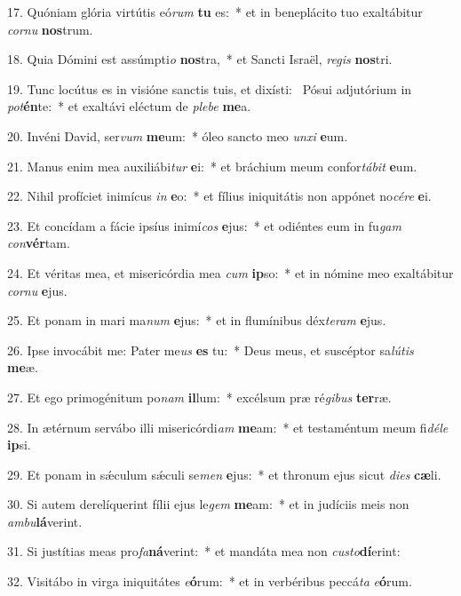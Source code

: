 17. Quóniam glória virtútis eó\textit{rum} \textbf{tu} es:~*  et in beneplácito tuo exaltábitur \textit{cor}\textit{nu} \textbf{nos}trum.\

18. Quia Dómini est assúmpti\textit{o} \textbf{nos}tra,~*  et Sancti Israël, \textit{re}\textit{gis} \textbf{nos}tri.\

19. Tunc locútus es in visióne sanctis tuis, et dixísti: \dag\  Pósui adjutórium in \textit{pot}\textbf{én}te:~*  et exaltávi eléctum de \textit{ple}\textit{be} \textbf{me}a.\

20. Invéni David, ser\textit{vum} \textbf{me}um:~*  óleo sancto meo \textit{un}\textit{xi} \textbf{e}um.\

21. Manus enim mea auxiliábi\textit{tur} \textbf{e}i:~*  et bráchium meum confor\textit{tá}\textit{bit} \textbf{e}um.\

22. Nihil profíciet inimícus \textit{in} \textbf{e}o:~*  et fílius iniquitátis non appónet no\textit{cé}\textit{re} \textbf{e}i.\

23. Et concídam a fácie ipsíus inimí\textit{cos} \textbf{e}jus:~*  et odiéntes eum in fu\textit{gam} \textit{con}\textbf{vér}tam.\

24. Et véritas mea, et misericórdia mea \textit{cum} \textbf{ip}so:~*  et in nómine meo exaltábitur \textit{cor}\textit{nu} \textbf{e}jus.\

25. Et ponam in mari ma\textit{num} \textbf{e}jus:~*  et in flumínibus déx\textit{te}\textit{ram} \textbf{e}jus.\

26. Ipse invocábit me: Pater me\textit{us} \textbf{es} tu:~*  Deus meus, et suscéptor sa\textit{lú}\textit{tis} \textbf{me}æ.\

27. Et ego primogénitum po\textit{nam} \textbf{il}lum:~*  excélsum præ ré\textit{gi}\textit{bus} \textbf{ter}ræ.\

28. In ætérnum servábo illi misericórdi\textit{am} \textbf{me}am:~*  et testaméntum meum fi\textit{dé}\textit{le} \textbf{ip}si.\

29. Et ponam in sǽculum sǽculi se\textit{men} \textbf{e}jus:~*  et thronum ejus sicut \textit{di}\textit{es} \textbf{cæ}li.\

30. Si autem derelíquerint fílii ejus le\textit{gem} \textbf{me}am:~*  et in judíciis meis non \textit{am}\textit{bu}\textbf{lá}verint.\

31. Si justítias meas pro\textit{fa}\textbf{ná}verint:~*  et mandáta mea non \textit{cus}\textit{to}\textbf{dí}erint:\

32. Visitábo in virga iniquitátes \textit{e}\textbf{ó}rum:~*  et in verbéribus peccá\textit{ta} \textit{e}\textbf{ó}rum.\

